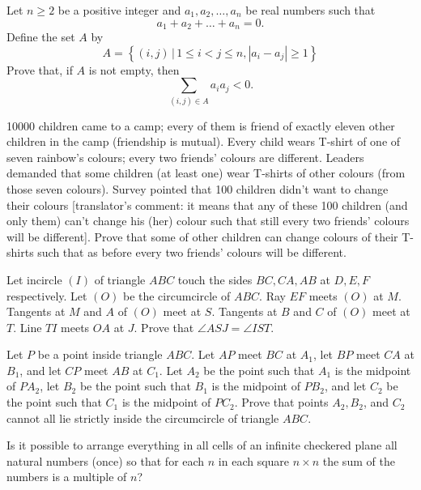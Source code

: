\documentclass[11pt]{scrartcl}
\begin{document}
\begin{problem}[781756252908608]
Let $n\geqslant 2$ be a positive integer and $a_1,a_2, \ldots ,a_n$ be real numbers such that\[a_1+a_2+\dots+a_n=0.\]Define the set $A$ by
\[A=\left\{(i, j)\,|\,1 \leqslant i<j \leqslant n,\left|a_{i}-a_{j}\right| \geqslant 1\right\}\]Prove that, if $A$ is not empty, then
\[\sum_{(i, j) \in A} a_{i} a_{j}<0.\]
\end{problem}
\begin{problem}[4527883777563937913]
10000 children came to a camp; every of them is friend of exactly eleven other children in the camp (friendship is mutual). Every child wears T-shirt of one of seven rainbow's colours; every two friends' colours are different. Leaders demanded that some children (at least one) wear T-shirts of other colours (from those seven colours). Survey pointed that 100 children didn't want to change their colours [translator's comment: it means that any of these 100 children (and only them) can't change his (her) colour such that still every two friends' colours will be different]. Prove that some of other children can change colours of their T-shirts such that as before every two friends' colours will be different.
\end{problem}
\begin{problem}[8972547734710795566]
Let incircle $(I)$ of triangle $ABC$ touch the sides $BC,CA,AB$ at $D,E,F$ respectively. Let $(O)$ be the circumcircle of $ABC$. Ray $EF$ meets $(O)$ at $M$. Tangents at $M$ and $A$ of $(O)$ meet at $S$. Tangents at $B$ and $C$ of $(O)$ meet at $T$. Line $TI$ meets $OA$ at $J$. Prove that $\angle ASJ=\angle IST$.
\end{problem}
\begin{problem}[3245291910836201005]
	Let $P$ be a point inside triangle $ABC$. Let $AP$ meet $BC$ at $A_1$, let $BP$ meet $CA$ at $B_1$, and let $CP$ meet $AB$ at $C_1$. Let $A_2$ be the point such that $A_1$ is the midpoint of $PA_2$, let $B_2$ be the point such that $B_1$ is the midpoint of $PB_2$, and let $C_2$ be the point such that $C_1$ is the midpoint of $PC_2$. Prove that points $A_2, B_2$, and $C_2$ cannot all lie strictly inside the circumcircle of triangle $ABC$.
\end{problem}
\begin{problem}[3048608408918882691]
	Is it possible to arrange everything in all cells of an infinite checkered plane all natural numbers (once) so that for each $n$ in each square $n \times n$ the sum of the numbers is a multiple of $n$?
\end{problem}
\end{document}

